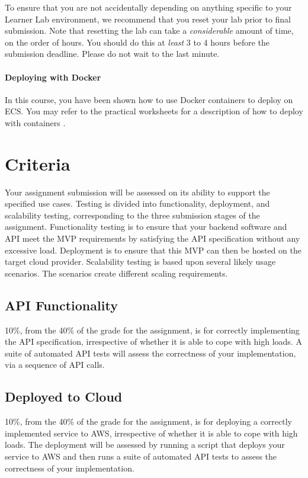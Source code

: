 \documentclass{csse4400}
\begin{document}
\noindent
To ensure that you are not accidentally depending on anything specific to your Learner Lab environment,
we recommend that you reset your lab prior to final submission.
Note that resetting the lab can take a \textit{considerable} amount of time, on the order of hours.
You should do this at \textit{least} 3 to 4 hours before the submission deadline.
Please do not wait to the last minute.

\paragraph{Deploying with Docker}
In this course, you have been shown how to use Docker containers to deploy on ECS.
You may refer to the practical worksheets for a description of how to deploy with containers \cite{prac-week5}.


\section{Criteria}
Your assignment submission will be assessed on its ability to support the specified use cases.
Testing is divided into functionality, deployment, and scalability testing,
corresponding to the three submission stages of the assignment.
Functionality testing is to ensure that your backend software and API
meet the MVP requirements by satisfying the API specification without any excessive load.
Deployment is to ensure that this MVP can then be hosted on the target cloud provider.
Scalability testing is based upon several likely usage scenarios.
The scenarios create different scaling requirements.

\subsection{API Functionality} %
10\%, from the 40\% of the grade for the assignment, is for correctly implementing the API specification,
irrespective of whether it is able to cope with high loads.
A suite of automated API tests will assess the correctness of your implementation, via a sequence of API calls.

\subsection{Deployed to Cloud} %
10\%, from the 40\% of the grade for the assignment, is for deploying a correctly implemented service to AWS,
irrespective of whether it is able to cope with high loads.
The deployment will be assessed by running a script that deploys your service to AWS
and then runs a suite of automated API tests to assess the correctness of your implementation.
\end{document}

